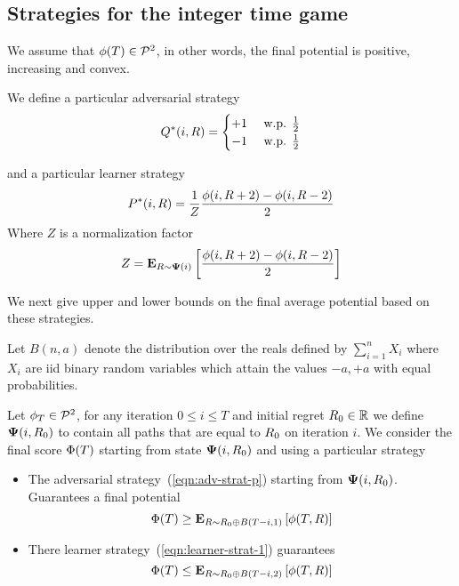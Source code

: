 \documentclass{article}[12pt]
\begin{document}
\subsection{Strategies for the integer time  game} \label{sec:strat-integer}

We assume that $\phi(T)  \in {\cal P}^{2}$, in other words, the final
potential is positive, increasing and convex.

We define a particular adversarial strategy
\begin{equation} \label{eqn:adv-strat-p}
  Q^*(i,R) =
  \begin{cases}
    +1 & \mbox{ w.p. } \frac{1}{2}\\
    -1 & \mbox{ w.p. } \frac{1}{2}\\
  \end{cases}
\end{equation}

and a particular learner strategy
\begin{equation} \label{eqn:learner-strat-1}
P^*(i,R) = \frac{1}{Z} \frac{\phi(i,R+2) - \phi(i,R-2)}{2}
\end{equation}
Where $Z$ is a normalization factor
$$Z = {\bf E}_{R \sim {\bf \Psi}(i)}\left[ \frac{\phi(i,R+2) - \phi(i,R-2)}{2} \right]$$

We next give upper and lower bounds on the final average potential
based on these strategies.

Let $B(n,a)$ denote the distribution over the reals defined by
$\sum_{i=1}^n X_i$ where $X_i$ are iid binary random variables which
attain the values $-a,+a$ with equal probabilities.

\begin{theorem} \label{thm:IntegerGameBounds}
  Let $\phi_T \in {\cal P}^{2}$, for any iteration $0 \leq i \leq T$ and
  initial regret $R_0 \in \mathbb{R}$ we define ${\bf \Psi}(i,R_0)$ to
  contain all paths that are equal to $R_0$ on iteration $i$. We
  consider the final score $\Phi(T)$ starting from state
  ${\bf \Psi}(i,R_0)$ and using a particular strategy
  \begin{itemize}
  \item
    The adversarial strategy~(\ref{eqn:adv-strat-p}) starting from
    ${\bf \Psi}(i,R_0)$. Guarantees a final potential 
     $$ \Phi(T) \geq {\bf E}_{R \sim R_0 \oplus B(T-i,1)}\left[ \phi(T,R) \right] $$
  \item
    There learner strategy~(\ref{eqn:learner-strat-1}) guarantees 
    $$\Phi(T) \leq {\bf E}_{R \sim R_0 \oplus B(T-i,2)}\left[ \phi(T,R) \right]$$
  \end{itemize}
\end{theorem}
\end{document}
